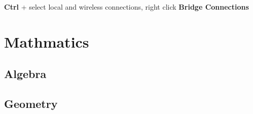 \documentclass[letterpaper,10pt,english]{sphinxmanual}
\begin{document}
\textbf{Ctrl} + select local and wireless connections, right click \textbf{Bridge Connections}


\chapter{Mathmatics}
\label{index:mathmatics}

\section{Algebra}
\label{math/algebra::doc}\label{math/algebra:algebra}

\section{Geometry}
\label{math/geometry:geometry}\label{math/geometry::doc}


\renewcommand{\indexname}{Index}
\printindex
\end{document}
